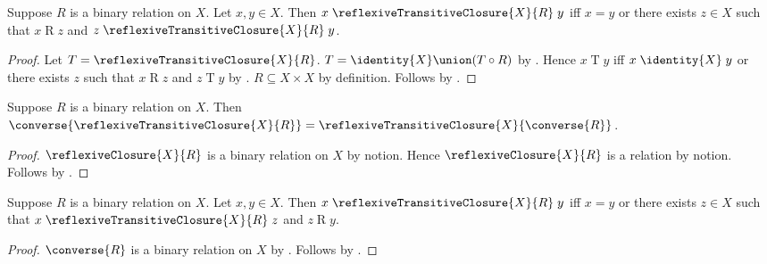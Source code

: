 \begin{theorem}\label{reflexive_transitive_closure_first_step}
    Suppose $R$ is a binary relation on $X$.
    Let $x,y\in X$.
    Then $x\mathrel{\reflexiveTransitiveClosure{X}{R}}y$ iff
        $x=y$ or there exists $z\in X$ such that
            $x\mathrel{R}z$ and
            $z\mathrel{\reflexiveTransitiveClosure{X}{R}}y$.
\end{theorem}
\begin{proof}
    Let $T=\reflexiveTransitiveClosure{X}{R}$.
    $T=\identity{X}\union(T\circ R)$ by
        .
    Hence $x\mathrel{T}y$ iff
        $x\mathrel{\identity{X}}y$ or there exists $z$ such that
            $x\mathrel{R}z$ and $z\mathrel{T}y$ by
        .
    $R\subseteq X\times X$ by definition.
    Follows by .
\end{proof}

\begin{theorem}\label{converse_reflexive_transitive_closure}
    Suppose $R$ is a binary relation on $X$.
    Then $\converse{\reflexiveTransitiveClosure{X}{R}}
        =\reflexiveTransitiveClosure{X}{\converse{R}}$.
\end{theorem}
\begin{proof}
    $\reflexiveClosure{X}{R}$ is a binary relation on $X$ by notion.
    Hence $\reflexiveClosure{X}{R}$ is a relation by notion.
    Follows by
        .
\end{proof}

\begin{theorem}\label{reflexive_transitive_closure_last_step}
    Suppose $R$ is a binary relation on $X$.
    Let $x,y\in X$.
    Then $x\mathrel{\reflexiveTransitiveClosure{X}{R}}y$ iff
        $x=y$ or there exists $z\in X$ such that
            $x\mathrel{\reflexiveTransitiveClosure{X}{R}}z$ and
            $z\mathrel{R}y$.
\end{theorem}
\begin{proof}
    $\converse{R}$ is a binary relation on $X$
        by .
    Follows by
        .
\end{proof}
